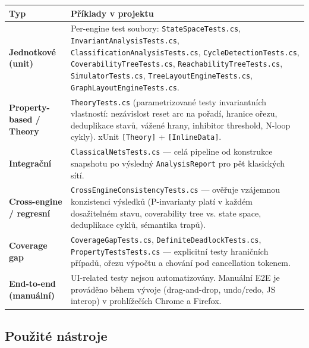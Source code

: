 \documentclass[12pt,a4paper]{article}
\begin{document}
\begin{longtable}{p{4.5cm}p{8.5cm}}
    \toprule
    \textbf{Typ} & \textbf{Příklady v projektu} \\
    \midrule
    \endhead
    \textbf{Jednotkové (unit)}      & Per-engine test soubory:
        \texttt{StateSpaceTests.cs}, \texttt{InvariantAnalysisTests.cs},
        \texttt{ClassificationAnalysisTests.cs}, \texttt{CycleDetectionTests.cs},
        \texttt{CoverabilityTreeTests.cs}, \texttt{ReachabilityTreeTests.cs},
        \texttt{SimulatorTests.cs}, \texttt{TreeLayoutEngineTests.cs},
        \texttt{GraphLayoutEngineTests.cs}. \\[3pt]
    \textbf{Property-based / Theory} &
        \texttt{TheoryTests.cs} (parametrizované testy invariantních
        vlastností: nezávislost reset arc na pořadí, hranice ořezu,
        deduplikace stavů, vážené hrany, inhibitor threshold,
        N-loop cykly). xUnit \texttt{[Theory]} + \texttt{[InlineData]}. \\[3pt]
    \textbf{Integrační}             &
        \texttt{ClassicalNetsTests.cs} — celá pipeline od konstrukce
        snapshotu po výsledný \texttt{AnalysisReport} pro pět klasických
        sítí. \\[3pt]
    \textbf{Cross-engine / regresní} &
        \texttt{CrossEngineConsistencyTests.cs} — ověřuje vzájemnou
        konzistenci výsledků (P-invarianty platí v každém dosažitelném
        stavu, coverability tree vs. state space, deduplikace cyklů,
        sémantika trapů). \\[3pt]
    \textbf{Coverage gap}            &
        \texttt{CoverageGapTests.cs}, \texttt{DefiniteDeadlockTests.cs},
        \texttt{PropertyTestsTests.cs} — explicitní testy hraničních
        případů, ořezu výpočtu a chování pod cancellation tokenem. \\[3pt]
    \textbf{End-to-end (manuální)}   &
        UI-related testy nejsou automatizovány. Manuální E2E je
        prováděno během vývoje (drag-and-drop, undo/redo, JS interop)
        v prohlížečích Chrome a Firefox. \\
    \bottomrule
\end{longtable}

\subsection{Použité nástroje}
\end{document}
